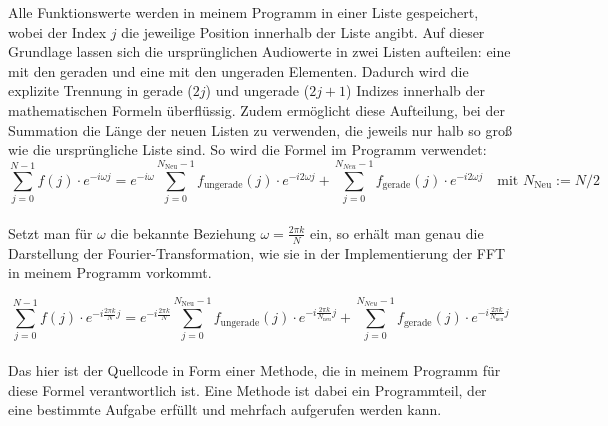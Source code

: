 \documentclass[a4paper,12pt]{article}
\theoremstyle{definition}
\theoremstyle{remark}
\begin{document}
Alle Funktionswerte werden in meinem Programm in einer Liste gespeichert, wobei der Index $j$ die jeweilige Position innerhalb 
der Liste angibt. Auf dieser Grundlage lassen sich die ursprünglichen Audiowerte in zwei Listen aufteilen: eine mit den geraden 
und eine mit den ungeraden Elementen. Dadurch wird die explizite Trennung in gerade ($2j$) und ungerade ($2j+1$) Indizes innerhalb 
der mathematischen Formeln überflüssig. Zudem ermöglicht diese Aufteilung, bei der Summation die Länge der neuen Listen zu 
verwenden, die jeweils nur halb so groß wie die ursprüngliche Liste sind. So wird die Formel im Programm verwendet: 
\[
\sum_{j=0}^{N-1}{f(j)\cdot e^{-i\omega j}} = e^{-i\omega}\sum_{j=0}^{N_{\text{Neu}}-1}{f_{\text{ungerade}}(j)\cdot e^{-i 2\omega j}} + \sum_{j=0}^{N_{Neu}-1}{f_{\text{gerade}}(j)\cdot e^{-i 2\omega j}} \quad \text{mit $N_{\text{Neu}} := N/2$ }
\]
\\
Setzt man für $\omega$ die bekannte Beziehung $\omega=\tfrac{2\pi k}{N}$ ein, so erhält man genau die Darstellung der 
Fourier-Transformation, wie sie in der Implementierung der FFT in meinem Programm vorkommt.

\[
\sum_{j=0}^{N-1}{f(j)\cdot e^{-i \frac{2\pi k}{N} j}} = e^{-i \frac{2\pi k}{N}} \sum_{j=0}^{N_{\text{Neu}}-1}{f_{\text{ungerade}}(j)\cdot e^{-i \frac{2\pi k}{N_{\text{neu}}} j}} + \sum_{j=0}^{N_{Neu}-1}{f_{\text{gerade}}(j)\cdot e^{-i \frac{2\pi k}{N_{\text{neu}}} j}}
\]
\\
Das hier ist der Quellcode in Form einer Methode, die in meinem Programm für diese Formel verantwortlich ist. Eine Methode ist 
dabei ein Programmteil, der eine bestimmte Aufgabe erfüllt und mehrfach aufgerufen werden kann.
\end{document}
